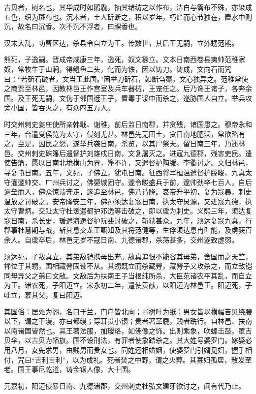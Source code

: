 \documentclass[12pt,UTF8]{ctexbook}
\begin{document}
吉贝者，树名也，其华成时如鹅毳，抽其绪纺之以作布，洁白与籥布不殊，亦染成五色，织为斑布也。沉木者，土人斫断之，积以岁年，朽烂而心节独在，置水中则沉，故名曰沉香。次不沉不浮者，曰祼香也。

汉末大乱，功曹区达，杀县令自立为王。传数世，其后王无嗣，立外甥范熊。

熊死，子逸嗣。晋成帝咸康三年，逸死，奴文篡立。文本日南西卷县夷帅范稚家奴，常牧牛于山涧，得鳢鱼二头，化而为铁，因以铸刀。铸成，文向石而咒曰：“若斫石破者，文当王此国。”因举刀斫石，如断刍藁，文心独异之。范稚常使之商贾至林邑，因教林邑王作宫室及兵车器械，王宠任之。后乃谗王诸子，各奔余国。及王死无嗣，文伪于邻国迓王子，置毒于浆中而杀之，遂胁国人自立。举兵攻旁小国，皆吞灭之，有众四五万人。

时交州刺史姜庄使所亲韩戢、谢稚，前后监日南郡，并贪残，诸国患之。穆帝永和三年，台遣夏侯览为太守，侵刻尤甚。林邑先无田土，贪日南地肥沃，常欲略有之，至是，因民之怨，遂举兵袭日南，杀览，以其尸祭天。留日南三年，乃还林邑。交州刺史硃籓后遣督护刘雄戍日南，文复屠灭之。进寇九德郡，残害吏民。遣使告籓，愿以日南北境横山为界，籓不许，又遣督护陶缓、李衢讨之。文归林邑，寻复屯日南。五年，文死，子佛立，犹屯日南。征西将军桓温遣督护滕畯、九真太守灌邃帅交、广州兵讨之，佛婴城固守。邃令畯盛兵于前，邃帅劲卒七百人，自后逾垒而入，佛众惊溃奔走，邃追至林邑，佛乃请降。哀帝升平初，复为寇暴，刺史温放之讨破之。安帝隆安三年，佛孙须达复寇日南，执太守炅源，又进寇九德，执太守曹炳。交趾太守杜瑗遣都护邓逸等击破之，即以瑗为刺史。义熙三年，须达复寇日南，杀长史，瑗遣海逻督护阮斐讨破之，斩获甚众。九年，须达复寇九真，行郡事杜慧期与战，斩其息交龙王甄知及其将范健等，生俘须达息冉阝能，及虏获百余人。自瑗卒后，林邑无岁不寇日南、九德诸郡，杀荡甚多，交州遂致虚弱。

须达死，子敌真立，其弟敌铠携母出奔。敌真追恨不能容其母弟，舍国而之天竺，禅位于其甥，国相藏膋固谏不从。其甥既立而杀藏膋，藏膋子又攻杀之，而立敌铠同母异父之弟曰文敌。文敌后为扶南王子当根纯所杀，大臣范诸农平其乱，而自立为王。诸农死，子阳迈立。宋永初二年，遣使贡献，以阳迈为林邑王。阳迈死，子咄立，慕其父，复曰阳迈。

其国俗：居处为阁，名曰于兰，门户皆北向；书树叶为纸；男女皆以横幅吉贝绕腰以下，谓之干漫，亦曰都缦；穿耳贯小镮；贵者著革屣，贱者跣行。自林邑、扶南以南诸国皆然也。其王著法服，加璎珞，如佛像之饰。出则乘象，吹螺击鼓，罩吉贝伞，以吉贝为幡旗。国不设刑法，有罪者使象踏杀之。其大姓号婆罗门。嫁娶必用八月，女先求男，由贱男而贵女也。同姓还相婚姻，使婆罗门引婿见妇，握手相付，咒曰“吉利吉利”，以为成礼。死者焚之中野，谓之火葬。其寡妇孤居，散发至老。国王事尼乾道，铸金银人像，大十围。

元嘉初，阳迈侵暴日南、九德诸郡，交州刺史杜弘文建牙欲讨之，闻有代乃止。
\end{document}

